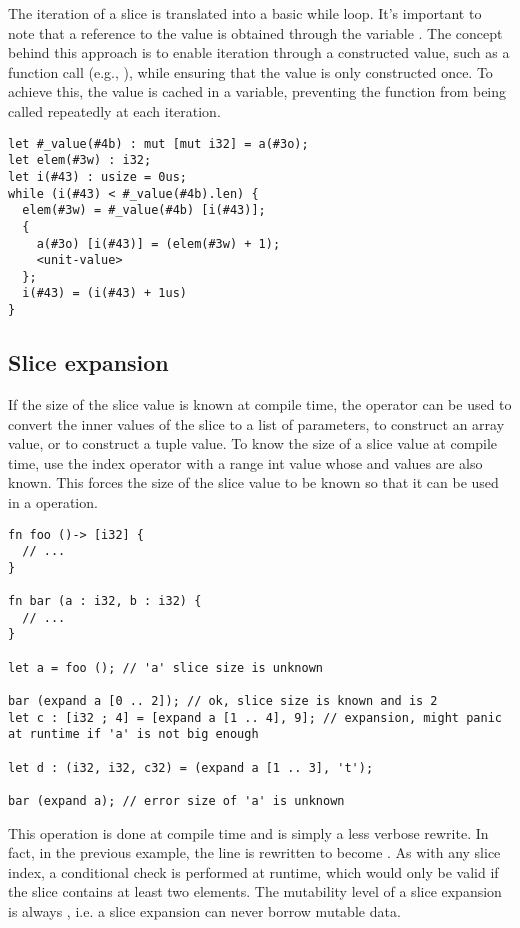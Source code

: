 The iteration of a slice is translated into a basic while loop. It's important
to note that a reference to the value is obtained through the variable
. The concept behind this approach is to enable iteration
through a constructed value, such as a function call (e.g., ), while ensuring that the value is only constructed once. To achieve
this, the value is cached in a variable, preventing the function from being
called repeatedly at each iteration.

\begin{lstlisting}[style=intermediateVerb]
let #_value(#4b) : mut [mut i32] = a(#3o);
let elem(#3w) : i32;
let i(#43) : usize = 0us;
while (i(#43) < #_value(#4b).len) {
  elem(#3w) = #_value(#4b) [i(#43)];
  {
    a(#3o) [i(#43)] = (elem(#3w) + 1);
    <unit-value>
  };
  i(#43) = (i(#43) + 1us)
}
\end{lstlisting}

\subsection{Slice expansion}

If the size of the slice value is known at compile time, the 
operator can be used to convert the inner values of the slice to a list of
parameters, to construct an array value, or to construct a tuple value. To know
the size of a slice value at compile time, use the index operator with a range
int value whose  and  values are also known. This forces
the size of the slice value to be known so that it can be used in a
 operation.

\begin{lstlisting}[style=coloredverbatim]
fn foo ()-> [i32] {
  // ...
}

fn bar (a : i32, b : i32) {
  // ...
}

let a = foo (); // 'a' slice size is unknown

bar (expand a [0 .. 2]); // ok, slice size is known and is 2
let c : [i32 ; 4] = [expand a [1 .. 4], 9]; // expansion, might panic at runtime if 'a' is not big enough

let d : (i32, i32, c32) = (expand a [1 .. 3], 't');

bar (expand a); // error size of 'a' is unknown
  \end{lstlisting}

This operation is done at compile time and is simply a less verbose rewrite. In
fact, in the previous example, the line  is
rewritten to become . As with any slice index, a
conditional check is performed at runtime, which would only be valid if the
slice  contains at least two elements. The mutability level of a slice
expansion is always , i.e. a slice expansion can never borrow mutable
data.


